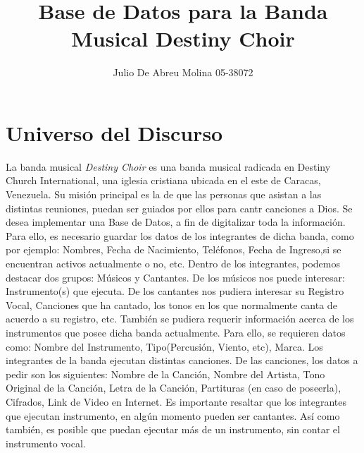 \documentclass[12pt,a4paper,spanish]{article}
\begin{document}
\title{Base de Datos para la Banda Musical Destiny Choir}
\author{Julio De Abreu Molina 05-38072}
\maketitle

\newpage
\section{Universo del Discurso}
	La banda musical \emph{Destiny Choir} es una banda musical radicada en Destiny Church International, una iglesia cristiana ubicada en el este de Caracas, Venezuela. Su misi\'on principal es la de que las personas que asistan a las distintas reuniones, puedan ser guiados por ellos para cantr canciones a Dios.
	\newline
	\newline
	\indent Se desea implementar una Base de Datos, a fin de digitalizar toda la informaci\'on. Para ello, es necesario guardar los datos de los integrantes de dicha banda, como por ejemplo: Nombres, Fecha de Nacimiento, Tel\'efonos, Fecha de Ingreso,si se encuentran activos actualmente o no, etc. Dentro de los integrantes, podemos destacar dos grupos: M\'usicos y Cantantes. De los m\'usicos nos puede interesar: Instrumento(s) que ejecuta. De los cantantes nos pudiera interesar su Registro Vocal, Canciones que ha cantado, los tonos en los que normalmente canta de acuerdo a su registro, etc. 
	\newline
	\newline
	\indent Tambi\'en se pudiera requerir informaci\'on acerca de los instrumentos que posee dicha banda actualmente. Para ello, se requieren datos como: Nombre del Instrumento, Tipo(Percusi\'on, Viento, etc), Marca.
	\newline
	\newline
	\indent  Los integrantes de la banda ejecutan distintas canciones. De las canciones, los datos a pedir son los siguientes: Nombre de la Canci\'on, Nombre del Artista, Tono Original de la Canci\'on, Letra de la Canci\'on, Partituras (en caso de poseerla), Cifrados, Link de Video en Internet. 
    \newline
    \newline
	\indent Es importante resaltar que los integrantes que ejecutan instrumento, en alg\'un momento pueden ser cantantes. As\'i como tambi\'en, es posible que puedan ejecutar m\'as de un instrumento, sin contar el instrumento vocal.
    \newline
\end{document}
